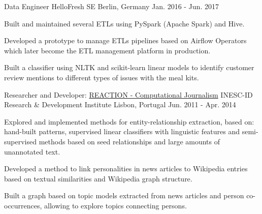 \begin{cventries}
  \cventry
    {Data Engineer} %
    {HelloFresh SE} %
    {Berlin, Germany} %
    {Jan. 2016 - Jun. 2017} %
    {
      \begin{cvitems} %
        \item {Built and maintained several ETLs using PySpark (Apache Spark) and Hive.}
        \item {Developed a prototype to manage ETLs pipelines based on Airflow Operators which later become the ETL management platform in production.}
        \item {Built a classifier using NLTK and scikit-learn linear models to identify customer review mentions to different types of issues with the meal kits.}
      \end{cvitems}
    }
	
  \cventry
    {Researcher and Developer: \href{http://arquivo.pt/wayback/20151118124735/http://dmir.inesc-id.pt/project/Reaction}{REACTION - Computational Journalism}} %
    {INESC-ID Research \& Development Institute} %
    {Lisbon, Portugal} %
    {Jun. 2011 - Apr. 2014} %
    {
      \begin{cvitems} %
        \item {Explored and implemented methods for entity-relationship extraction, based on: hand-built patterns, supervised linear classifiers with linguistic features and semi-supervised methods based on seed relationships and large amounts of unannotated text.}
        \item {Developed a method to link personalities in news articles to Wikipedia entries based on textual similarities and Wikipedia graph structure.}
        \item {Built a graph based on topic models extracted from news articles and person co-occurrences, allowing to explore topics connecting persons.}
      \end{cvitems}
    }



\end{cventries}
